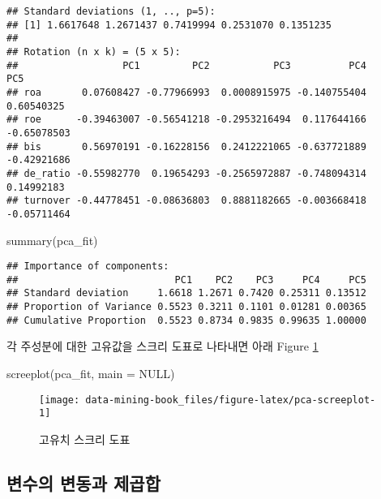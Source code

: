 \documentclass[
]{book}
\newenvironment{Shaded}{\begin{snugshade}}{\end{snugshade}}
\newcommand{\AttributeTok}[1]{\textcolor[rgb]{0.77,0.63,0.00}{#1}}
\newcommand{\ConstantTok}[1]{\textcolor[rgb]{0.00,0.00,0.00}{#1}}
\newcommand{\FunctionTok}[1]{\textcolor[rgb]{0.00,0.00,0.00}{#1}}
\newcommand{\NormalTok}[1]{#1}
\begin{document}
\begin{verbatim}
## Standard deviations (1, .., p=5):
## [1] 1.6617648 1.2671437 0.7419994 0.2531070 0.1351235
## 
## Rotation (n x k) = (5 x 5):
##                  PC1         PC2           PC3          PC4         PC5
## roa       0.07608427 -0.77966993  0.0008915975 -0.140755404  0.60540325
## roe      -0.39463007 -0.56541218 -0.2953216494  0.117644166 -0.65078503
## bis       0.56970191 -0.16228156  0.2412221065 -0.637721889 -0.42921686
## de_ratio -0.55982770  0.19654293 -0.2565972887 -0.748094314  0.14992183
## turnover -0.44778451 -0.08636803  0.8881182665 -0.003668418 -0.05711464
\end{verbatim}

\begin{Shaded}
\begin{Highlighting}[]
\FunctionTok{summary}\NormalTok{(pca\_fit)}
\end{Highlighting}
\end{Shaded}

\begin{verbatim}
## Importance of components:
##                           PC1    PC2    PC3     PC4     PC5
## Standard deviation     1.6618 1.2671 0.7420 0.25311 0.13512
## Proportion of Variance 0.5523 0.3211 0.1101 0.01281 0.00365
## Cumulative Proportion  0.5523 0.8734 0.9835 0.99635 1.00000
\end{verbatim}

각 주성분에 대한 고유값을 스크리 도표로 나타내면 아래 Figure \ref{fig:pca-screeplot}

\begin{Shaded}
\begin{Highlighting}[]
\FunctionTok{screeplot}\NormalTok{(pca\_fit, }\AttributeTok{main =} \ConstantTok{NULL}\NormalTok{)}
\end{Highlighting}
\end{Shaded}

\begin{figure}

{\centering \texttt{[image: data-mining-book\_files/figure-latex/pca-screeplot-1]} 

}

\caption{고유치 스크리 도표}\label{fig:pca-screeplot}
\end{figure}

\hypertarget{pca-ss}{%
\subsection{변수의 변동과 제곱합}\label{pca-ss}}
\end{document}
